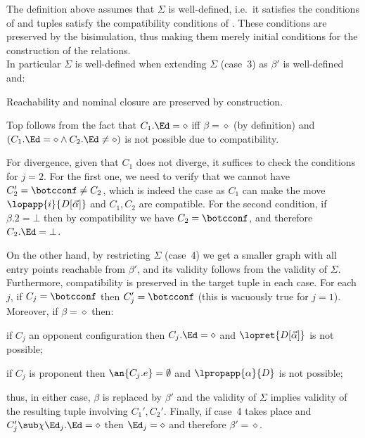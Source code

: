 \begin{remark}
  The definition above assumes that $\Sigma$ is well-defined, i.e.\ it satisfies the conditions of  and tuples satisfy the compatibility conditions of . These conditions are preserved by the bisimulation, thus making them merely initial conditions for the construction of the relations.
\\
  In particular $\Sigma$ is well-defined when extending $\Sigma$ (case~3) as $\beta'$ is well-defined and:
  \begin{compactitem}
  \item Reachability and nominal closure are preserved by construction.
  \item Top follows from the fact that  $C_1.\Ed=\diamond$ iff $\beta=\diamond$ (by definition) and $(C_1.\Ed=\diamond\land C_2.\Ed\neq\diamond)$ is not possible due to compatibility.
  \item For divergence, given that $C_1$ does not diverge, it suffices to check the conditions for $j=2$. For the first one, we need to verify that we cannot have $C_2'=\botcconf\not=C_2$, which is indeed the case as $C_1$ can make the move $\lopapp{i}{D[\vec\alpha]}$ and $C_1,C_2$ are compatible.
For the second condition, if $\beta.2=\bot$ then by compatibility we have $C_2=\botcconf$, and therefore $C_2.\Ed=\bot$.
\end{compactitem}
On the other hand, by restricting $\Sigma$ (case~4) we get a smaller graph with all entry points reachable from $\beta'$, and its validity follows from the validity of $\Sigma$.\\
Furthermore,  compatibility is preserved in the target tuple in each case. For
each $j$,
 if $C_j=\botcconf$ then $C_j'=\botcconf$ (this is vacuously true for $j=1$).
Moreover, if $\beta=\diamond$ then:
  \begin{compactitem}
  \item if $C_j$ an opponent configuration then $C_j.\Ed=\diamond$ and  $\lopret{D[\vec\alpha]}$ is not possible;
    \item if $C_j$ is proponent then $\an{C_j.e}=\emptyset$ and $\lpropapp{\alpha}{D}$ is not possible;
    \end{compactitem}
        thus, in either case, $\beta$ is replaced by $\beta'$ and the validity of $\Sigma$ implies validity of the resulting tuple involving $C_1',C_2'$. Finally, if case~4 takes place and $C_j'\sub\chi{\Ed_j}.\Ed=\diamond$ then $\Ed_j=\diamond$ and therefore $\beta'=\diamond$.
\end{remark}


